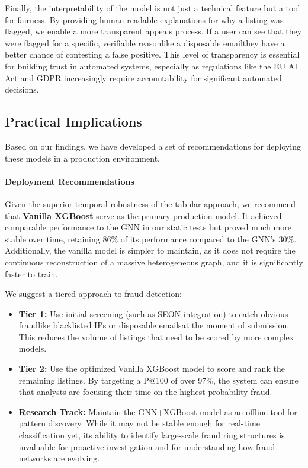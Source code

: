 Finally, the interpretability of the model is not just a technical feature but a tool for fairness. By providing human-readable explanations for why a listing was flagged, we enable a more transparent appeals process. If a user can see that they were flagged for a specific, verifiable reasonlike a disposable emailthey have a better chance of contesting a false positive. This level of transparency is essential for building trust in automated systems, especially as regulations like the EU AI Act and GDPR increasingly require accountability for significant automated decisions.

\subsection{Practical Implications}
\label{sec:5_10_3}

Based on our findings, we have developed a set of recommendations for deploying these models in a production environment.

\paragraph{Deployment Recommendations}

Given the superior temporal robustness of the tabular approach, we recommend that \textbf{Vanilla XGBoost} serve as the primary production model. It achieved comparable performance to the GNN in our static tests but proved much more stable over time, retaining 86\% of its performance compared to the GNN's 30\%. Additionally, the vanilla model is simpler to maintain, as it does not require the continuous reconstruction of a massive heterogeneous graph, and it is significantly faster to train.

We suggest a tiered approach to fraud detection:
\begin{itemize}
    \item \textbf{Tier 1:} Use initial screening (such as SEON integration) to catch obvious fraudlike blacklisted IPs or disposable emailsat the moment of submission. This reduces the volume of listings that need to be scored by more complex models.
    \item \textbf{Tier 2:} Use the optimized Vanilla XGBoost model to score and rank the remaining listings. By targeting a P@100 of over 97\%, the system can ensure that analysts are focusing their time on the highest-probability fraud.
    \item \textbf{Research Track:} Maintain the GNN+XGBoost model as an offline tool for pattern discovery. While it may not be stable enough for real-time classification yet, its ability to identify large-scale fraud ring structures is invaluable for proactive investigation and for understanding how fraud networks are evolving.
\end{itemize}

